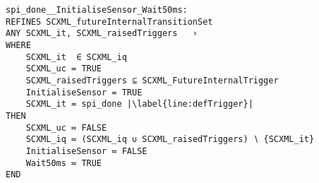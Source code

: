 \begin{lstlisting}[caption={Event-B event corresponding to internal triggered transition to \textbf{Wait50ms} state in refinement level 1 shown in~\ref{fig:ASIC}}, label={lst:SecBotMach0},language=Event-B, escapechar=|, frame=single]
spi_done__InitialiseSensor_Wait50ms:	
REFINES SCXML_futureInternalTransitionSet 
ANY	SCXML_it, SCXML_raisedTriggers	 ›
WHERE
	SCXML_it  ∈ SCXML_iq 
	SCXML_uc = TRUE
	SCXML_raisedTriggers ⊆ SCXML_FutureInternalTrigger
	InitialiseSensor = TRUE
	SCXML_it = spi_done |\label{line:defTrigger}|
THEN
	SCXML_uc ≔ FALSE
	SCXML_iq ≔ (SCXML_iq ∪ SCXML_raisedTriggers) ∖ {SCXML_it}
	InitialiseSensor ≔ FALSE
	Wait50ms ≔ TRUE
END
\end{lstlisting}

